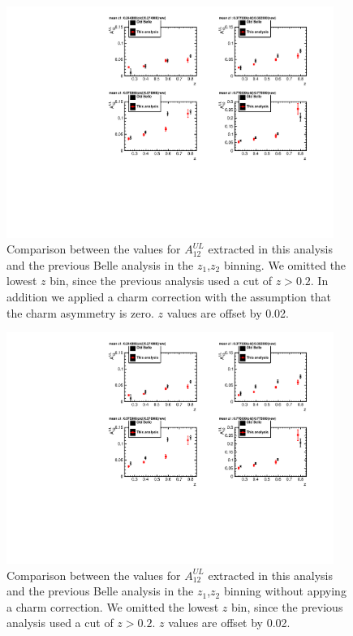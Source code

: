 \begin{figure}[H]
\includegraphics[width=0.95\textwidth]{figure_asy/BelleCompZ25CharmCorr.pdf}
\caption{\label{fig:belleCompCharmCorr} Comparison between the values for $A^{UL}_{12}$ extracted in this analysis and the previous Belle analysis in the $z_1$,$z_2$ binning. We omitted the lowest $z$ bin, since the previous analysis used a cut of $z>0.2$. In addition we applied a charm correction with the assumption that the charm asymmetry is zero. $z$ values are offset by 0.02.}
\end{figure}

\begin{figure}[H]
\includegraphics[width=0.95\textwidth]{figure_asy/BelleCompZ25.pdf}
\caption{\label{fig:belleComp} Comparison between the values for $A^{UL}_{12}$ extracted in this analysis and the previous Belle analysis in the $z_1$,$z_2$ binning without appying a charm correction. We omitted the lowest $z$ bin, since the previous analysis used a cut of $z>0.2$. $z$ values are offset by 0.02.}
\end{figure}

